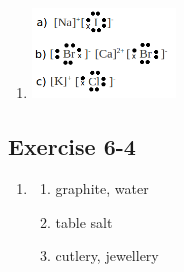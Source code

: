 \begin{enumerate}[label=\textbf{\arabic*}.]
\item %
\includegraphics[width=0.3\textwidth]{photos/bonding_lewis_diagrams_ion.png}
\end{enumerate}

\subsection{Exercise 6-4} 
\begin{multicols}{3}
\begin{enumerate}[label=\textbf{\arabic*}.]
\item %
\begin{enumerate}[label=\textbf{\alph*}.]
\item graphite, water
\item table salt
\item cutlery, jewellery
\end{enumerate}
\end{enumerate}
\end{multicols}
